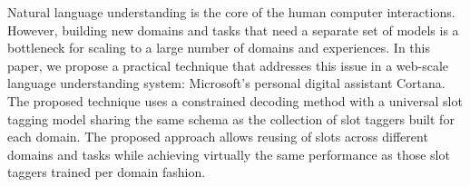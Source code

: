 Natural language understanding is the core of the human computer interactions. However, building new domains and tasks that need a separate set of models is a bottleneck for scaling to a large number of domains and experiences. In this paper, we propose a practical technique that addresses this issue in a web-scale language understanding system: Microsoft's personal digital assistant Cortana. The proposed technique uses a constrained decoding method with a universal slot tagging model sharing the same schema as the collection of slot taggers built for each domain. The proposed approach allows reusing of slots across different domains and tasks while achieving virtually the same performance as those slot taggers trained per domain fashion.
